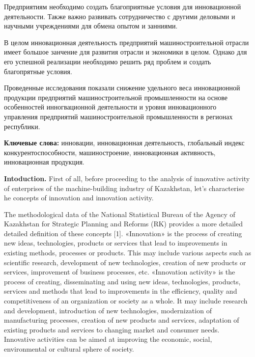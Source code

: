 {{Предприятиям необходимо создать благоприятные условия для инновационной
деятельности. Также важно развивать сотрудничество с другими деловыми и
научными учреждениями для обмена опытом и занниями.

В целом инновационная деятельность предприятий машиностроительной
отрасли имеет большое занчение для развития отрасли и экономики в целом.
Однако для его успешной реализации необходимо решить ряд проблем и
создать благопрятные условия.

Проведенные исследования показали снижение удельного веса инновационной
продукции предприятий машиностроительной промышленности на основе
особенностей инногвационной деятельности и уровня инновационного
управления предприятий машиностроительной промышленности в регионах
республики.

{\bfseries Ключевые слова:} инновации, инновационная деятельность,
глобальный индекс конкурентоспособности, машиностроение, инновационная
активность, инновационная продукция.

{\bfseries Intoduction.} First of all, before proceeding to the analysis of
innovative activity of enterprises of the machine-building industry of
Kazakhstan, let's characterise he concepts of innovation and innovation
activity.

The methodological data of the National Statistical Bureau of the Agency
of Kazakhstan for Strategic Planning and Reforms (RK) provides a more
detailed detailed definition of these concepts {[}1{]}. «Innovation» is
the process of creating new ideas, technologies, products or services
that lead to improvements in existing methods, processes or products.
This may include various aspects such as scientific research,
development of new technologies, creation of new products or services,
improvement of business processes, etc. «Innovation activity» is the
process of creating, disseminating and using new ideas, technologies,
products, services and methods that lead to improvements in the
efficiency, quality and competitiveness of an organization or society as
a whole. It may include research and development, introduction of new
technologies, modernization of manufacturing processes, creation of new
products and services, adaptation of existing products and services to
changing market and consumer needs. Innovative activities can be aimed
at improving the economic, social, environmental or cultural sphere of
society.

}}
